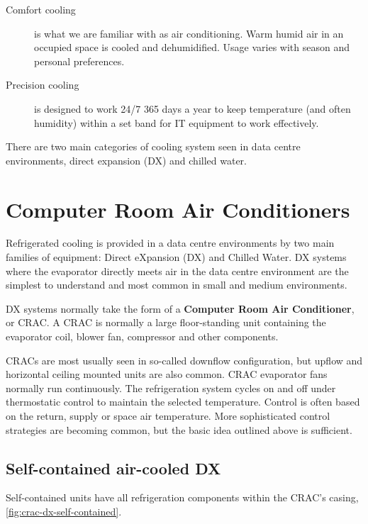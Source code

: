 \documentclass{pgnotes}
\begin{document}
\begin{description}
\item[Comfort cooling] is what we are familiar with as air conditioning. Warm humid air in an occupied space is cooled and dehumidified. Usage varies with season and personal preferences.
\item[Precision cooling] is designed to work 24/7 365 days a year to keep temperature (and often humidity) within a set band for IT equipment to work effectively. 
\end{description}

There are two main categories of cooling system seen in data centre environments, direct expansion (DX) and chilled water.

\section{Computer Room Air Conditioners}

Refrigerated cooling is provided in a data centre environments by two main families of equipment: Direct eXpansion (DX) and Chilled Water.
DX systems where the evaporator directly meets air in the data centre environment are the simplest to understand and most common in small and medium environments.

DX systems normally take the form of a \textbf{Computer Room Air Conditioner}, or CRAC.
A CRAC is normally a large floor-standing unit containing the evaporator coil, blower fan, compressor and other components.


CRACs are most usually seen in so-called downflow configuration, but upflow and horizontal ceiling mounted units are also common.
CRAC evaporator fans normally run continuously.
The refrigeration system cycles on and off under thermostatic control to maintain the selected temperature.
Control is often based on the return, supply or space air temperature.
More sophisticated control strategies are becoming common, but the basic idea outlined above is sufficient.


\subsection{Self-contained air-cooled DX}
\label{sec:self-contained-air-cooled-dx}

Self-contained units have all refrigeration components within the CRAC's casing, \autoref{fig:crac-dx-self-contained}.
\end{document}
